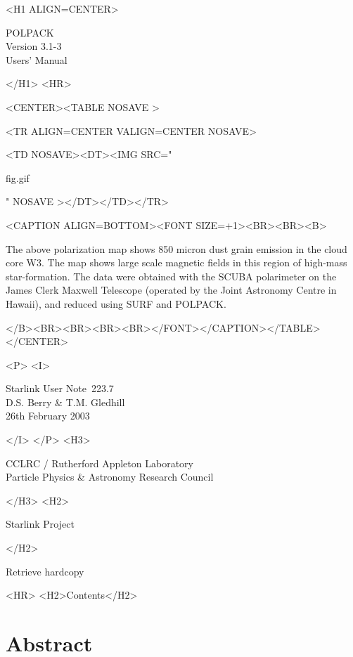 \documentclass[twoside,11pt]{article}
\newcommand{\stardoccategory}  {Starlink User Note}
\newcommand{\stardocsource}    {sun\stardocnumber}
\newcommand{\stardocnumber}    {223.7}
\newcommand{\stardocauthors}   {D.S. Berry \& T.M. Gledhill }
\newcommand{\stardocdate}      {26th February 2003}
\newcommand{\stardoctitle}     {POLPACK}
\newcommand{\stardocversion}   {Version 3.1-3}
\newcommand{\stardocmanual}    {Users' Manual}
\newcommand{\htmladdnormallink}[2]{#1}
\newcommand{\htmladdimg}[1]{}
\newcommand{\htmlref}[2]{#1}
\newcommand{\htmladdtonavigation}[1]{}
\newcommand{\xlabel}[1]{}
\renewcommand{\_}{\texttt{\symbol{95}}}
\newcommand{\htmlfig}[3]{
   \label{#1}
   \begin{rawhtml} <CENTER><TABLE NOSAVE > \end{rawhtml}
   \begin{rawhtml} <TR ALIGN=CENTER VALIGN=CENTER NOSAVE> \end{rawhtml}
   \begin{rawhtml} <TD NOSAVE><DT><IMG SRC=" \end{rawhtml}
   #2
   \begin{rawhtml} " NOSAVE ></DT></TD></TR> \end{rawhtml}
   \begin{rawhtml} <CAPTION ALIGN=BOTTOM><FONT SIZE=+1><BR><BR><B> \end{rawhtml}
   #3 
   \begin{rawhtml} </B><BR><BR><BR><BR></FONT></CAPTION></TABLE></CENTER> \end{rawhtml}
}
\begin{document}
\begin{htmlonly}
   \xlabel{}
   \begin{rawhtml} <H1 ALIGN=CENTER> \end{rawhtml}
      \stardoctitle\\
      \stardocversion\\
      \stardocmanual
   \begin{rawhtml} </H1> <HR> \end{rawhtml}

   \htmlfig{map2}{fig.gif}{The above polarization map shows 
   850 micron dust grain emission in the cloud core W3. The map shows large 
   scale magnetic fields in this region of high-mass star-formation. The 
   data were obtained with the SCUBA polarimeter on the James Clerk Maxwell 
   Telescope  (operated by the Joint Astronomy Centre in Hawaii), and 
   reduced using SURF and POLPACK.}

   \begin{rawhtml} <P> <I> \end{rawhtml}
   \stardoccategory\ \stardocnumber \\
   \stardocauthors \\
   \stardocdate
   \begin{rawhtml} </I> </P> <H3> \end{rawhtml}
      \htmladdnormallink{CCLRC}{http://www.cclrc.ac.uk} /
      \htmladdnormallink{Rutherford Appleton Laboratory}
                        {http://www.cclrc.ac.uk/ral} \\
      \htmladdnormallink{Particle Physics \& Astronomy Research Council}
                        {http://www.pparc.ac.uk} \\
   \begin{rawhtml} </H3> <H2> \end{rawhtml}
      \htmladdnormallink{Starlink Project}{http://www.starlink.rl.ac.uk/}
   \begin{rawhtml} </H2> \end{rawhtml}
   \htmladdnormallink{\htmladdimg{source.gif} Retrieve hardcopy}
      {http://www.starlink.rl.ac.uk/cgi-bin/hcserver?\stardocsource}\\

  \label{stardoccontents}
  \begin{rawhtml} 
    <HR>
    <H2>Contents</H2>
  \end{rawhtml}
  \htmladdtonavigation{\htmlref{\htmladdimg{contents_motif.gif}}
        {stardoccontents}}

  \section{\xlabel{abstract}Abstract}
\end{htmlonly}
\end{document}
